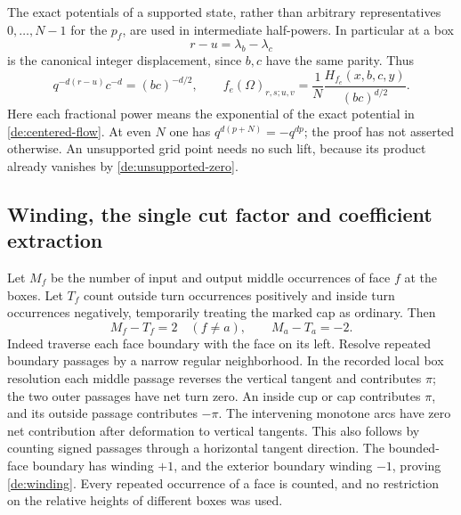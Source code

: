 The exact potentials of a supported state, rather than arbitrary
representatives \(0,\ldots,N-1\) for the \(p_f\), are used in
intermediate half-powers. In particular at a box
\[
                 r-u=\lambda_b-\lambda_c
\]
is the canonical integer displacement, since \(b,c\) have the
same parity. Thus
\begin{equation}\label{de:coherent-adapter}
 q^{-d(r-u)}c^{-d}=(bc)^{-d/2},\qquad
 f_e(\Omega)_{r,s;u,v}
        =\frac1N\frac{H_{f_e}(x,b,c,y)}{(bc)^{d/2}}.
\end{equation}
Here each fractional power means the exponential of the exact
potential in \eqref{de:centered-flow}. At even \(N\) one has
\(q^{d(p+N)}=-q^{dp}\); the proof has not asserted otherwise.
An unsupported grid point needs no such lift, because its
product already vanishes by \eqref{de:unsupported-zero}.

\subsection{Winding, the single cut factor and coefficient extraction}

Let \(M_f\) be the number of input and output middle occurrences
of face \(f\) at the boxes. Let \(T_f\) count outside turn
occurrences positively and inside turn occurrences negatively,
temporarily treating the marked cap as ordinary.
Then
\begin{equation}\label{de:winding}
 M_f-T_f=2\quad(f\ne a),\qquad M_a-T_a=-2.
\end{equation}
Indeed traverse each face boundary with the face on its left.
Resolve repeated boundary passages by a narrow regular
neighborhood. In the recorded local box resolution each middle
passage reverses the vertical tangent and contributes \(\pi\);
the two outer passages have net turn zero. An inside cup or cap
contributes \(\pi\), and its outside passage contributes
\(-\pi\). The intervening monotone arcs have zero net contribution
after deformation to vertical tangents. This also follows by
counting signed passages through a horizontal tangent direction.
The bounded-face boundary has winding \(+1\), and the exterior
boundary winding \(-1\), proving \eqref{de:winding}. Every repeated
occurrence of a face is counted, and no restriction on the
relative heights of different boxes was used.

